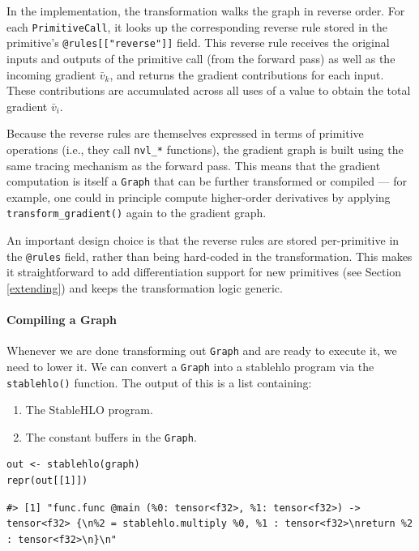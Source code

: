 In the implementation, the transformation walks the graph in reverse order.
For each \texttt{PrimitiveCall}, it looks up the corresponding reverse rule stored in the primitive's \texttt{@rules{[}{[}"reverse"{]}{]}} field.
This reverse rule receives the original inputs and outputs of the primitive call (from the forward pass) as well as the incoming gradient \(\bar{v}_k\), and returns the gradient contributions for each input.
These contributions are accumulated across all uses of a value to obtain the total gradient \(\bar{v}_i\).

Because the reverse rules are themselves expressed in terms of primitive operations (i.e., they call \texttt{nvl\_*} functions), the gradient graph is built using the same tracing mechanism as the forward pass.
This means that the gradient computation is itself a \texttt{Graph} that can be further transformed or compiled --- for example, one could in principle compute higher-order derivatives by applying \texttt{transform\_gradient()} again to the gradient graph.

An important design choice is that the reverse rules are stored per-primitive in the \texttt{@rules} field, rather than being hard-coded in the transformation.
This makes it straightforward to add differentiation support for new primitives (see Section \ref{extending}) and keeps the transformation logic generic.

\paragraph{Compiling a Graph}\label{compiling-a-graph}

Whenever we are done transforming out \texttt{Graph} and are ready to execute it, we need to lower it.
We can convert a \texttt{Graph} into a stablehlo program via the \texttt{stablehlo()} function.
The output of this is a list containing:

\begin{enumerate}
\def\labelenumi{\arabic{enumi}.}
\tightlist
\item
  The StableHLO program.
\item
  The constant buffers in the \texttt{Graph}.
\end{enumerate}

\begin{verbatim}
out <- stablehlo(graph)
repr(out[[1]])
\end{verbatim}

\begin{verbatim}
#> [1] "func.func @main (%0: tensor<f32>, %1: tensor<f32>) -> tensor<f32> {\n%2 = stablehlo.multiply %0, %1 : tensor<f32>\nreturn %2 : tensor<f32>\n}\n"
\end{verbatim}

